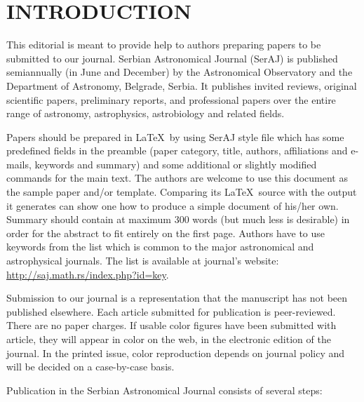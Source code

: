 \documentclass{article_saj}
\renewcommand{\thefootnote}{\fnsymbol{footnote}}
\begin{document}
\tenrm


\section{INTRODUCTION}

\indent

This
editorial is meant to provide help to authors preparing
papers to be submitted to our journal. Serbian Astronomical
Journal (SerAJ) is published semiannually (in June and December)
by the Astronomical Observatory and the Department of Astronomy,
Belgrade, Serbia. It publishes invited reviews, original
scientific papers, preliminary reports, and professional papers
over the entire range of astronomy, astrophysics, astrobiology and
related fields. 

\renewcommand{\thefootnote}{\arabic{footnote}}

Papers should be prepared in \LaTeX\ by using SerAJ style file
which has some predefined fields in the preamble (paper category,
title, authors, affiliations and e-mails, keywords and summary)
and some additional or slightly modified commands for the main
text. The authors are welcome to use this document as the sample
paper and/or template. Comparing its \LaTeX\ source with the output it generates can show one how
to produce a simple document of his/her own. Summary should
contain at maximum 300 words (but much less is desirable) in
order for the abstract to fit entirely on the first page. Authors have
to use keywords from the list which is common to the major
astronomical and astrophysical journals. The list is available at
journal's website: \url{http://saj.math.rs/index.php?id=key}.

Submission to our journal is a representation that the manuscript
has not been published elsewhere. Each article submitted for
publication is peer-reviewed. There are no paper charges. If
usable color figures have been submitted with article, they will
appear in color on the web, in the electronic edition of the
journal. In the printed issue, color reproduction depends on
journal policy and will be decided on a case-by-case basis.

Publication in the Serbian Astronomical Journal consists of
several steps:
\end{document}
